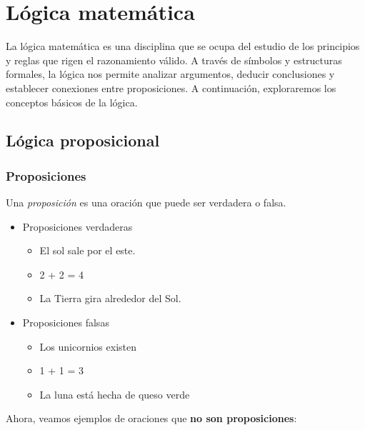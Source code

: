 \chapter{Lógica matemática}
La lógica matemática es una disciplina que se ocupa del estudio de los principios y reglas que rigen el razonamiento válido. A través de símbolos y estructuras formales, la lógica nos permite analizar argumentos, deducir conclusiones y establecer conexiones entre proposiciones. A continuación, exploraremos los conceptos básicos de la lógica.

\section{Lógica proposicional}

\subsection{Proposiciones}
\vspace{1em}
\begin{fmd-definition}[Proposición]
	Una \textit{proposición} es una oración que puede ser verdadera o falsa.
\end{fmd-definition}

\begin{fmd-example}
	\begin{itemize}
		\item Proposiciones verdaderas
		\begin{itemize}
			\item El sol sale por el este.
			\item 2 + 2 = 4
			\item La Tierra gira alrededor del Sol.
		\end{itemize}
		
		\item Proposiciones falsas
		\begin{itemize}
			\item Los unicornios existen
			\item 1 + 1 = 3
			\item La luna está hecha de queso verde
		\end{itemize}
	\end{itemize}
\end{fmd-example}

Ahora, veamos ejemplos de oraciones que \textbf{no son proposiciones}:


